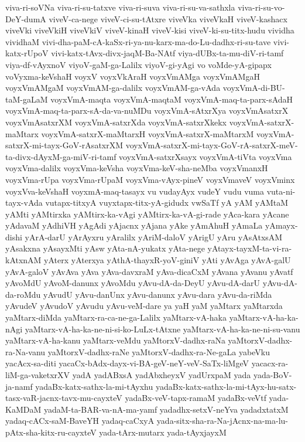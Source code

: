 {viva-ri-soVNa
viva-ri-su-tatxve
viva-ri-suva
viva-ri-su-va-sathxla
viva-ri-su-vo-DeY-dumA
viveV-ca-nege
viveV-ci-su-tAtxre
viveVka
viveVkaH
viveV-kashacx
viveVki
viveVkiH
viveVkiV
viveV-kinaH
viveV-kisi
viveV-ki-su-titx-hudu
vividha
vividhaM
vivi-dha-paM-cA-kaSx-ri-ya-nu-karx-ma-do-Lu-dadhx-ri-su-tave
vivi-katx-rUpoV
vivi-katx-tAvx-divx-jaqM-Ba-NAtf
viya-dUBx-ta-mu-diV-ri-tamf
viya-df-vAyxnoV
viyoV-gaM-ga-Lalilx
viyoV-gi-yAgi
vo
voMde-yA-gipapx
voVyxma-keVshaH
voyxV
voyxVkAraH
voyxVmAMga
voyxVmAMgaH
voyxVmAMgaM
voyxVmAM-ga-dalilx
voyxVmAM-ga-vAda
voyxVmA-di-BU-taM-gaLaM
voyxVmA-maqta
voyxVmA-maqtaM
voyxVmA-maq-ta-parx-sAdaH
voyxVmA-maq-ta-parx-sA-da-va-nuMDu
voyxVmA-sAtxrXya
voyxVmAsatxrX
voyxVmAsatxrXM
voyxVmA-satxrXda
voyxVmA-satxrXkekx
voyxVmA-satxrX-maMtarx
voyxVmA-satxrX-maMtarxH
voyxVmA-satxrX-maMtarxM
voyxVmA-satxrX-mi-tayx-GoV-rAsatxrXM
voyxVmA-satxrX-mi-tayx-GoV-rA-satxrX-meV-ta-divx-dAyxM-ga-miV-ri-tamf
voyxVmA-satxrXsayx
voyxVmA-tiVta
voyxVma
voyxVma-dalilx
voyxVma-keVsha
voyxVma-keV-sha-neMba
voyxVmanxH
voyxVma-rUpa
voyxVma-rUpaM
voyxVma-vAyx-pineV
voyxVmaveV
voyxVminx
voyxVva-keVshaH
voyxmA-maq-tasayx
vu
vudayAyx
vudeY
vudu
vuma
vuta-ni-tayx-vAda
vutapx-titxyA
vuyxtapx-titx-yA-gidudx
vwSaTf
yA
yAM
yAMtaM
yAMti
yAMtirxka
yAMtirx-ka-vAgi
yAMtirx-ka-vA-gi-rade
yAca-kara
yAcane
yAdavaM
yAdhiVH
yAgAdi
yAjacnx
yAjana
yAke
yAmAhuH
yAmaLa
yAmayx-dishi
yArA-darU
yArAyxru
yAralilx
yAriM-daloV
yArigU
yAru
yAsAtxsAM
yAsakxna
yAsayxMti
yAsw
yAta-nA-yukatx
yAta-nege
yAtayx-tayxM-ta-vi-ra-kAtxnAM
yAterx
yAterxya
yAthA-thayxR-yoV-giniV
yAti
yAvAga
yAvA-galU
yAvA-galoV
yAvAva
yAva
yAva-davxraM
yAva-dicaCxM
yAvana
yAvanu
yAvatf
yAvoMdU
yAvoM-danunx
yAvoMdu
yAvu-dA-da-DeyU
yAvu-dA-darU
yAvu-dA-da-roMdu
yAvudU
yAvu-danUnx
yAvu-danunx
yAvu-dara
yAvu-da-riMda
yAvudeV
yAvudoV
yAvudu
yAvu-veM-dare
ya
yaH
yaM
yaMtarx
yaMtarxda
yaMtarx-diMda
yaMtarx-ra-ca-ne-ga-Lalilx
yaMtarx-vA-haka
yaMtarx-vA-ha-ka-nAgi
yaMtarx-vA-ha-ka-ne-ni-si-ko-LuLx-tAtxne
yaMtarx-vA-ha-ka-ne-ni-su-vanu
yaMtarx-vA-ha-kanu
yaMtarx-veMdu
yaMtorxV-dadhx-raNa
yaMtorxV-dadhx-ra-Na-vanu
yaMtorxV-dadhx-raNe
yaMtorxV-dadhx-ra-Ne-gaLa
yabeVku
yacAcx-sa-diti
yacaCx-bAdx-dayx-vi-BA-geV-neY-veV-SaTx-liMgeV
yacacx-ra-liM-ga-vaketxrXV
yadA
yadABxsA
yadAbxheyxV
yadUrxpaM
yada
yada-BoV-ja-namf
yadaBx-katx-sathx-la-mi-tAyxhu
yadaBx-katx-sathx-la-mi-tAyx-hu-satx-tasx-vaR-jacnx-tavx-mu-cayxteV
yadaBx-veV-tapx-ramaM
yadaBx-veVtf
yada-KaMDaM
yadaM-ta-BAR-va-nA-ma-yamf
yadadhx-setxV-neYva
yadadxtatxM
yadaq-cACx-saM-BaveYH
yadaq-caCxyA
yada-sitx-sha-ra-Na-jAcnx-na-ma-lu-pAtx-sha-kitx-ru-cayxteV
yada-tArx-mutarx
yada-tAyxjayxM
}
